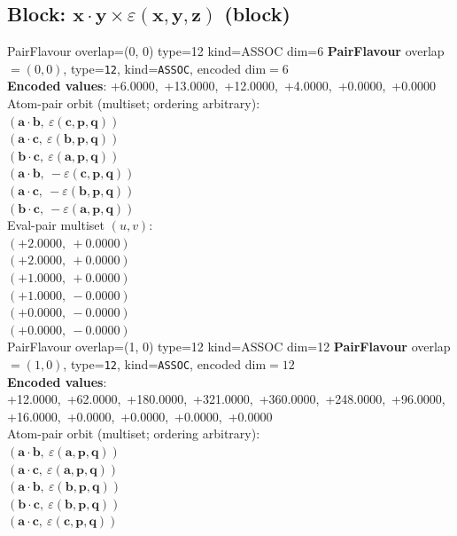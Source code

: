 \documentclass[a4paper,11pt]{article}
\newcommand{\pdcegfomjfhook}[2]{\mathbf{#1} \cdot \mathbf{#2}}
\newcommand{\kblbmcpggoncpf}[3]{\varepsilon(\mathbf{#1},\mathbf{#2},\mathbf{#3})}
\begin{document}
\subsection{Block: $\pdcegfomjfhook{x}{y} \times \kblbmcpggoncpf{x}{y}{z}$  (block)}
    PairFlavour  overlap=(0, 0)  type=12  kind=ASSOC  dim=6
\textbf{PairFlavour} overlap$=(0, 0)$, type=\texttt{12}, kind=\texttt{ASSOC}, encoded dim$=6$\\
\textbf{      Encoded values}: +6.0000,\ +13.0000,\ +12.0000,\ +4.0000,\ +0.0000,\ +0.0000\\
\quad Atom-pair orbit (multiset; ordering arbitrary):\\
$(\pdcegfomjfhook{a}{b},\ \kblbmcpggoncpf{c}{p}{q})$\\
$(\pdcegfomjfhook{a}{c},\ \kblbmcpggoncpf{b}{p}{q})$\\
$(\pdcegfomjfhook{b}{c},\ \kblbmcpggoncpf{a}{p}{q})$\\
$(\pdcegfomjfhook{a}{b},\ -\kblbmcpggoncpf{c}{p}{q})$\\
$(\pdcegfomjfhook{a}{c},\ -\kblbmcpggoncpf{b}{p}{q})$\\
$(\pdcegfomjfhook{b}{c},\ -\kblbmcpggoncpf{a}{p}{q})$\\
\quad Eval-pair multiset $(u, v)$:\\
$(+2.0000,\ +0.0000)$\\
$(+2.0000,\ +0.0000)$\\
$(+1.0000,\ +0.0000)$\\
$(+1.0000,\ -0.0000)$\\
$(+0.0000,\ -0.0000)$\\
$(+0.0000,\ -0.0000)$\\
    PairFlavour  overlap=(1, 0)  type=12  kind=ASSOC  dim=12
\textbf{PairFlavour} overlap$=(1, 0)$, type=\texttt{12}, kind=\texttt{ASSOC}, encoded dim$=12$\\
\textbf{      Encoded values}: +12.0000,\ +62.0000,\ +180.0000,\ +321.0000,\ +360.0000,\ +248.0000,\ +96.0000,\ +16.0000,\ +0.0000,\ +0.0000,\ +0.0000,\ +0.0000\\
\quad Atom-pair orbit (multiset; ordering arbitrary):\\
$(\pdcegfomjfhook{a}{b},\ \kblbmcpggoncpf{a}{p}{q})$\\
$(\pdcegfomjfhook{a}{c},\ \kblbmcpggoncpf{a}{p}{q})$\\
$(\pdcegfomjfhook{a}{b},\ \kblbmcpggoncpf{b}{p}{q})$\\
$(\pdcegfomjfhook{b}{c},\ \kblbmcpggoncpf{b}{p}{q})$\\
$(\pdcegfomjfhook{a}{c},\ \kblbmcpggoncpf{c}{p}{q})$\\
\end{document}
